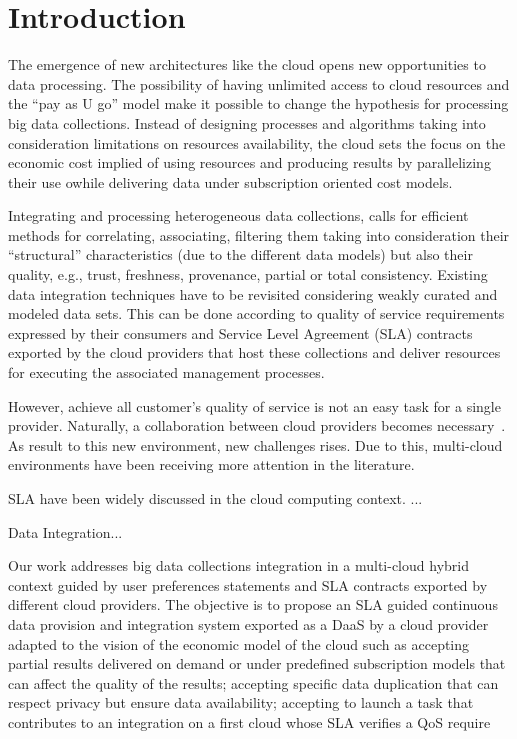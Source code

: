 \section{Introduction}
\label{sec:intro}


The emergence of new architectures like the cloud opens new opportunities to data processing. 
The possibility of having unlimited access to cloud resources and the ``pay as U go'' model make it possible to change the hypothesis for processing big  data collections. 
Instead of designing processes and algorithms taking into consideration  limitations on resources availability, the cloud sets the focus on the economic cost implied of using resources and producing results by parallelizing their use owhile delivering data under subscription oriented cost models.
 
Integrating and processing heterogeneous data collections, calls for efficient methods for correlating, associating, filtering them taking into consideration their ``structural'' characteristics (due to the different data models) but also their quality, e.g., trust, freshness, provenance, partial or total consistency. 
Existing data integration techniques have to be revisited considering weakly curated and modeled data sets. This can be done according to quality of service requirements expressed by their consumers and Service Level Agreement (SLA) contracts exported by the cloud providers that host  these collections and deliver resources for executing the associated management processes.

However, achieve all customer's quality of service is not an easy task for a single provider.
Naturally, a collaboration between cloud providers becomes necessary~\cite{036}.
As result to this new environment, new challenges rises.
Due to this, multi-cloud environments have been receiving more attention in the literature.

SLA have been widely discussed in the cloud computing context. ...

Data Integration...


Our work addresses big data collections integration  in a multi-cloud hybrid context guided by user preferences statements and SLA contracts exported by different cloud providers. The objective is to propose an SLA guided continuous data provision and integration system exported as a DaaS by a cloud provider adapted to the vision of the economic model of the cloud such as accepting partial results delivered on demand or under predefined subscription models that can affect the quality of the results; accepting specific data duplication that can respect privacy but ensure data availability; accepting to launch a task that contributes to an integration on a first cloud whose SLA verifies a QoS require



